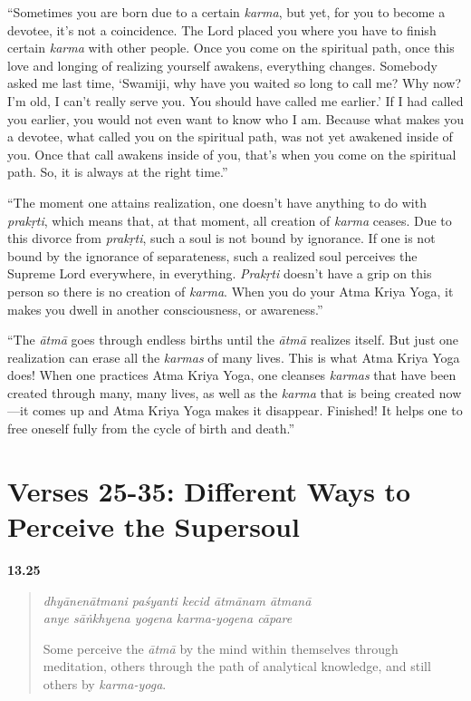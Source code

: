 \enquote{Sometimes you are born due to a certain \textit{karma}, but yet, for you to become a devotee, it’s not a coincidence. The Lord placed you where you have to finish certain \textit{karma} with other people. Once you come on the spiritual path, once this love and longing of realizing yourself awakens, everything changes. Somebody asked me last time, \enquote{Swamiji, why have you waited so long to call me? Why now? I’m old, I can’t really serve you. You should have called me earlier.} If I had called you earlier, you would not even want to know who I am. Because what makes you a devotee, what called you on the spiritual path, was not yet awakened inside of you. Once that call awakens inside of you, that’s when you come on the spiritual path. So, it is always at the right time.}

\enquote{The moment one attains realization, one doesn’t have anything to do with \textit{prakṛti}, which means that, at that moment, all creation of \textit{karma} ceases. Due to this divorce from \textit{prakṛti}, such a soul is not bound by ignorance. If one is not bound by the ignorance of separateness, such a realized soul perceives the Supreme Lord everywhere, in everything. \textit{Prakṛti} doesn’t have a grip on this person so there is no creation of \textit{karma}. When you do your Atma Kriya Yoga, it makes you dwell in another consciousness, or awareness.}

\enquote{The \textit{ātmā} goes through endless births until the \textit{ātmā} realizes itself. But just one realization can erase all the \textit{karmas} of many lives. This is what Atma Kriya Yoga does! When one practices Atma Kriya Yoga, one cleanses \textit{karmas} that have been created through many, many lives, as well as the \textit{karma} that is being created now---it comes up and Atma Kriya Yoga makes it disappear. Finished! It helps one to free oneself fully from the cycle of birth and death.}

\section{Verses 25-35: Different Ways to Perceive the Supersoul}\label{sec-verses-25-35-different-ways-to-perceive-the-supersoul}


\par\noindent\textbf{13.25}\par
\begin{verse}
\textit{dhyānenātmani paśyanti kecid ātmānam ātmanā} \\
\textit{anye sāṅkhyena yogena karma-yogena cāpare}

\noindent Some perceive the \textit{ātmā} by the mind within themselves through meditation, others through the path of analytical knowledge, and still others by \textit{karma-yoga}.
\end{verse}
\par



